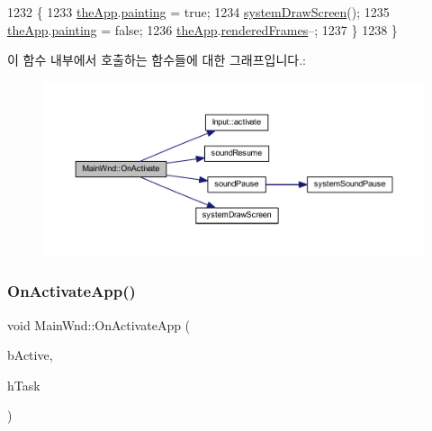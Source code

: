\begin{DoxyCode}
1232   \{
1233     \mbox{\hyperlink{_v_b_a_8cpp_a8095a9d06b37a7efe3723f3218ad8fb3}{theApp}}.\mbox{\hyperlink{class_v_b_a_acf5db3724f3961d0c7b7a48b1682ab09}{painting}} = \textcolor{keyword}{true};
1234     \mbox{\hyperlink{system_8cpp_a14942622916d869491ac62211b9db1b6}{systemDrawScreen}}();
1235     \mbox{\hyperlink{_v_b_a_8cpp_a8095a9d06b37a7efe3723f3218ad8fb3}{theApp}}.\mbox{\hyperlink{class_v_b_a_acf5db3724f3961d0c7b7a48b1682ab09}{painting}} = \textcolor{keyword}{false};
1236     \mbox{\hyperlink{_v_b_a_8cpp_a8095a9d06b37a7efe3723f3218ad8fb3}{theApp}}.\mbox{\hyperlink{class_v_b_a_a05df4a540441a0a8862376af6a2fc57b}{renderedFrames}}--;
1237   \}
1238 \}
\end{DoxyCode}
이 함수 내부에서 호출하는 함수들에 대한 그래프입니다.\+:
\nopagebreak
\begin{figure}[H]
\begin{center}
\leavevmode
\includegraphics[width=350pt]{class_main_wnd_a13b06fced945b76eb11328fb66f70123_cgraph}
\end{center}
\end{figure}
\mbox{\label{class_main_wnd_af5891778521ca0b293453e8d6be97533}} 
\subsubsection{\texorpdfstring{On\+Activate\+App()}{OnActivateApp()}}
{\footnotesize\ttfamily void Main\+Wnd\+::\+On\+Activate\+App (\begin{DoxyParamCaption}\item[{B\+O\+OL}]{b\+Active,  }\item[{H\+T\+A\+SK}]{h\+Task }\end{DoxyParamCaption})\hspace{0.3cm}{\ttfamily [protected]}}



